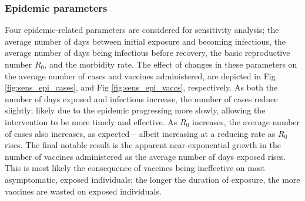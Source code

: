 \documentclass[10pt,letterpaper]{article}
\begin{document}
\subsubsection*{Epidemic parameters}
Four epidemic-related parameters are considered for sensitivity analysis; the average number of days between initial exposure and becoming infectious, the average number of days being infectious before recovery, the basic reproductive number $R_{0}$, and the morbidity rate. The effect of changes in these parameters on the average number of cases and vaccines administered, are depicted in Fig \ref{fig:sens_epi_cases}, and Fig \ref{fig:sens_epi_vaccs}, respectively. As both the number of days exposed and infectious increase, the number of cases reduce slightly; likely due to the epidemic progressing more slowly, allowing the intervention to be more timely and effective. As $R_{0}$ increases, the average number of cases also increases, as expected -- albeit increasing at a reducing rate as $R_{0}$ rises. The final notable result is the apparent near-exponential growth in the number of vaccines administered as the average number of days exposed rises. This is most likely the consequence of vaccines being ineffective on most asymptomatic, exposed individuals; the longer the duration of exposure, the more vaccines are wasted on exposed individuals.
\end{document}
